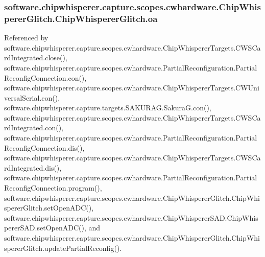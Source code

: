\subsubsection[{oa}]{\setlength{\rightskip}{0pt plus 5cm}software.\+chipwhisperer.\+capture.\+scopes.\+cwhardware.\+Chip\+Whisperer\+Glitch.\+Chip\+Whisperer\+Glitch.\+oa}\label{classsoftware_1_1chipwhisperer_1_1capture_1_1scopes_1_1cwhardware_1_1ChipWhispererGlitch_1_1ChipWhispererGlitch_ad102fb22832ef3ea823622bc982d17f7}


Referenced by software.\+chipwhisperer.\+capture.\+scopes.\+cwhardware.\+Chip\+Whisperer\+Targets.\+C\+W\+S\+Card\+Integrated.\+close(), software.\+chipwhisperer.\+capture.\+scopes.\+cwhardware.\+Partial\+Reconfiguration.\+Partial\+Reconfig\+Connection.\+con(), software.\+chipwhisperer.\+capture.\+scopes.\+cwhardware.\+Chip\+Whisperer\+Targets.\+C\+W\+Universal\+Serial.\+con(), software.\+chipwhisperer.\+capture.\+targets.\+S\+A\+K\+U\+R\+A\+G.\+Sakura\+G.\+con(), software.\+chipwhisperer.\+capture.\+scopes.\+cwhardware.\+Chip\+Whisperer\+Targets.\+C\+W\+S\+Card\+Integrated.\+con(), software.\+chipwhisperer.\+capture.\+scopes.\+cwhardware.\+Partial\+Reconfiguration.\+Partial\+Reconfig\+Connection.\+dis(), software.\+chipwhisperer.\+capture.\+scopes.\+cwhardware.\+Chip\+Whisperer\+Targets.\+C\+W\+S\+Card\+Integrated.\+dis(), software.\+chipwhisperer.\+capture.\+scopes.\+cwhardware.\+Partial\+Reconfiguration.\+Partial\+Reconfig\+Connection.\+program(), software.\+chipwhisperer.\+capture.\+scopes.\+cwhardware.\+Chip\+Whisperer\+Glitch.\+Chip\+Whisperer\+Glitch.\+set\+Open\+A\+D\+C(), software.\+chipwhisperer.\+capture.\+scopes.\+cwhardware.\+Chip\+Whisperer\+S\+A\+D.\+Chip\+Whisperer\+S\+A\+D.\+set\+Open\+A\+D\+C(), and software.\+chipwhisperer.\+capture.\+scopes.\+cwhardware.\+Chip\+Whisperer\+Glitch.\+Chip\+Whisperer\+Glitch.\+update\+Partial\+Reconfig().

\hypertarget{classsoftware_1_1chipwhisperer_1_1capture_1_1scopes_1_1cwhardware_1_1ChipWhispererGlitch_1_1ChipWhispererGlitch_aaf683c49a9113957348c91907b380381}{}

